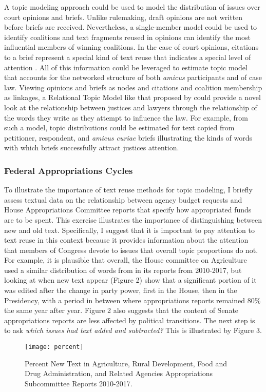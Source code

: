 \documentclass{article}
\begin{document}
A  topic modeling approach could be used to model the distribution of issues over court opinions and briefs. Unlike rulemaking, draft opinions are not written before briefs are received. Nevertheless, a single-member model could be used to identify coalitions and text fragments reused in opinions can identify the most influential members of winning coalitions. In the case of court opinions, citations to a brief represent a special kind of text reuse that indicates a special level of attention \citep{Cross2010}. All of this information could be leveraged to estimate topic model that accounts for the networked structure of both \textit{amicus} participants and of case law.  Viewing opinions and briefs as nodes and citations and coalition membership as linkages, a Relational Topic Model like that proposed by \citet{Chang2009} could provide a novel look at the relationship between justices and lawyers through the relationship of the words they write as they attempt to influence the law. For example, from such a model, topic distributions could be estimated for text copied from petitioner, respondent, and \textit{amicus curiae} briefs illustrating the kinds of words with which briefs successfully attract justices attention.

\subsubsection{Federal Appropriations Cycles}
To illustrate the importance of text reuse methods for topic modeling, I briefly assess textual data on the relationship between agency budget requests and House Appropriations Committee reports that specify how appropriated funds are to be spent. This exercise illustrates the importance of distinguishing between new and old text. Specifically, I suggest that it is important to pay attention to text reuse in this context because it provides information about the attention that members of Congress devote to issues that overall topic proportions do not.  For example, it is plausible that overall, the House committee on Agriculture used a similar distribution of words from in its reports from 2010-2017, but looking at when new text appear (Figure 2) show that a significant portion of it was edited after the change in party power, first in the House, then in the Presidency, with a period in between where appropriations reports remained 80\% the same year after year. Figure 2 also suggests that the content of Senate appropriations reports are less affected by political transitions. The next step is to ask \textit{which issues had text added and subtracted?} This is illustrated by Figure 3.
\begin{figure}[!ht]\centering
\label{USDA6}
\caption{Percent New Text in Agriculture, Rural Development, Food and Drug Administration, and Related Agencies Appropriations Subcommittee Reports 2010-2017.}
\texttt{[image: percent]}
\end{figure}
\end{document}
